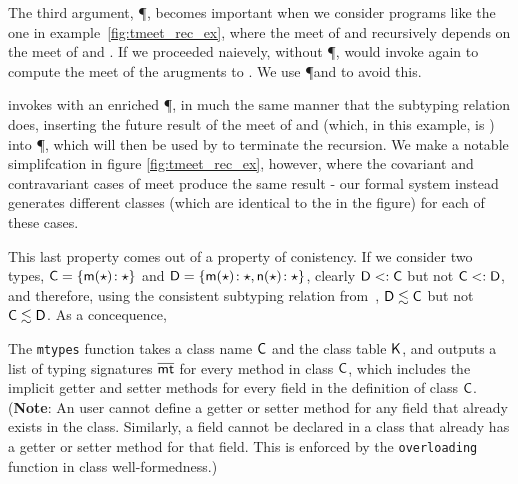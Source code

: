 \documentclass[a4paper,USenglish]{tex/lipics-v2016}
\begin{document}
The third argument, \P, becomes important when we consider programs like the one in example~\ref{fig:tmeet_rec_ex}, where the meet 
of  and  recursively depends on the meet of  and . If we proceeded naievely, without \P,  would
invoke  again to compute the meet of the arugments to \m. We use \P and  to avoid this.

 invokes  with an enriched \P, in much the same manner that the subtyping relation does, inserting the future
result of the meet of  and  (which, in this example, is ) into \P, which will then be used by  to terminate
the recursion. We make a notable simplifcation in figure \ref{fig:tmeet_rec_ex}, however, where the covariant and contravariant cases of meet
produce the same result - our formal system instead generates different classes (which are identical to the  in the figure) for each of 
these cases.

This last property comes out of a property of conistency. If we consider two types, ${\sf{C}} = \{ {{\sf{m}}(\star)}\!:{\star}\}$ and 
${\sf{D}} = \{ {{\sf{m}}(\star)}\!:{\star},  {{\sf{n}}(\star)}\!:{\star}\}$, clearly ${\sf{D}} <: {\sf{C}}$ but not ${\sf{C}} <: {\sf{D}}$, and therefore, using the consistent subtyping relation from~\cite{SiekTaha07}, 
${\sf{D}} \lesssim {\sf{C}}$ but not ${\sf{C}} \lesssim {\sf{D}}$. As a concequence, 

The \texttt{mtypes} function takes a class name ${\sf{C}}$ and the class table
${\sf{K}}$, and outputs a list of typing signatures $\overline{{\sf{mt}}}$ for every method in
class ${\sf{C}}$, which includes the implicit getter and setter methods for every
field in the definition of class ${\sf{C}}$.  (\textbf{Note}: An user cannot
define a getter or setter method for any field that already exists in the
class. Similarly, a field cannot be declared in a class that already has a
getter or setter method for that field. This is enforced by the
\texttt{overloading} function in class well-formedness.)
\end{document}
